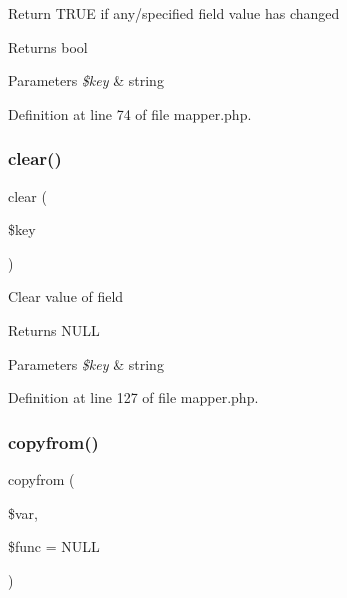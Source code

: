 Return T\+R\+UE if any/specified field value has changed \begin{DoxyReturn}{Returns}
bool 
\end{DoxyReturn}

\begin{DoxyParams}{Parameters}
{\em \$key} & string \\
\hline
\end{DoxyParams}


Definition at line 74 of file mapper.\+php.

\hypertarget{class_d_b_1_1_s_q_l_1_1_mapper_a10a949ef75de6c82c98ac555f371ba83}{}\label{class_d_b_1_1_s_q_l_1_1_mapper_a10a949ef75de6c82c98ac555f371ba83} 
\subsubsection{\texorpdfstring{clear()}{clear()}}
{\footnotesize\ttfamily clear (\begin{DoxyParamCaption}\item[{}]{\$key }\end{DoxyParamCaption})}

Clear value of field \begin{DoxyReturn}{Returns}
N\+U\+LL 
\end{DoxyReturn}

\begin{DoxyParams}{Parameters}
{\em \$key} & string \\
\hline
\end{DoxyParams}


Definition at line 127 of file mapper.\+php.

\hypertarget{class_d_b_1_1_s_q_l_1_1_mapper_adffe904ab38af888d9b033647ec6d935}{}\label{class_d_b_1_1_s_q_l_1_1_mapper_adffe904ab38af888d9b033647ec6d935} 
\subsubsection{\texorpdfstring{copyfrom()}{copyfrom()}}
{\footnotesize\ttfamily copyfrom (\begin{DoxyParamCaption}\item[{}]{\$var,  }\item[{}]{\$func = {\ttfamily NULL} }\end{DoxyParamCaption})}


